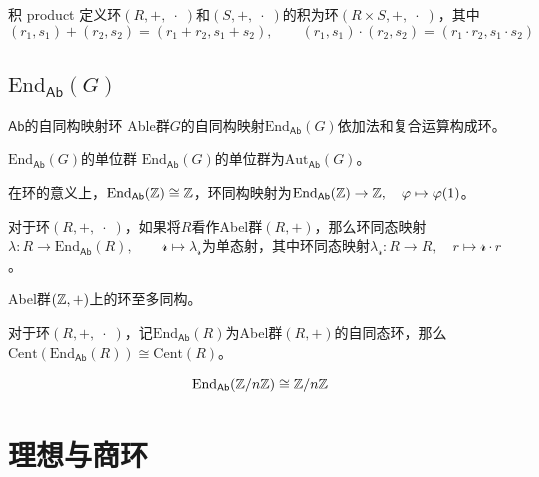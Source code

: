 \begin{definition}{积 product}
	定义环$(R,+,\;\cdot\;)$和$(S,+,\;\cdot\;)$的积为环$(R\times S,+,\;\cdot\;)$，其中
	$$
	(r_1,s_1)+(r_2,s_2)=(r_1+r_2,s_1+s_2),\qquad 
	(r_1,s_1)\cdot (r_2,s_2)=(r_1\cdot r_2,s_1\cdot s_2)
	$$
\end{definition}

\subsection{$\mathrm{End}_{\mathsf{Ab}}(G)$}

\begin{definition}{$\mathsf{Ab}$的自同构映射环}
	Able群$G$的自同构映射$\mathrm{End}_{\mathsf{Ab}}(G)$依加法和复合运算构成环。
\end{definition}

\begin{definition}{$\mathrm{End}_{\mathsf{Ab}}(G)$的单位群}
	$\mathrm{End}_{\mathsf{Ab}}(G)$的单位群为$\mathrm{Aut}_{\mathsf{Ab}}(G)$。
\end{definition}

\begin{proposition}
	在环的意义上，$\mathrm{End}_{\mathsf{Ab}}(\mathbb{Z})\cong\mathbb{Z}$，环同构映射为$\mathrm{End}_{\mathsf{Ab}}(\mathbb{Z})\to\mathbb{Z},\quad \varphi\mapsto \varphi(1)$。
\end{proposition}

\begin{proposition}
	对于环$(R,+,\;\cdot\;)$，如果将$R$看作Abel群$(R,+)$，那么环同态映射$\lambda:R\to \mathrm{End}_{\mathsf{Ab}}(R),\qquad \mathcal{r}\mapsto \lambda_{\mathcal{r}}$为单态射，其中环同态映射$\lambda_{\mathcal{r}}:R\to R,\quad r\mapsto \mathcal{r}\cdot r$。
\end{proposition}

\begin{proposition}
	Abel群$(\mathbb{Z},+)$上的环至多同构。
\end{proposition}

\begin{proposition}
	对于环$(R,+,\;\cdot\;)$，记$\mathrm{End}_{\mathsf{Ab}}(R)$为Abel群$(R,+)$的自同态环，那么$\mathrm{Cent}(\mathrm{End}_{\mathsf{Ab}}(R))\cong \mathrm{Cent}(R)$。
\end{proposition}

\begin{proposition}
	$$
	\mathrm{End}_{\mathsf{Ab}}(\mathbb{Z}/n\mathbb{Z})\cong \mathbb{Z}/n\mathbb{Z}
	$$
\end{proposition}

\section{理想与商环}

